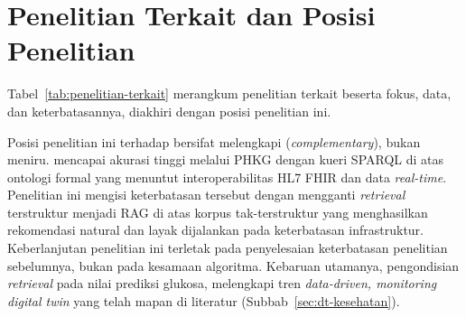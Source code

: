 \section{Penelitian Terkait dan Posisi Penelitian}
Tabel~\ref{tab:penelitian-terkait} merangkum penelitian terkait beserta fokus, data, dan keterbatasannya, diakhiri dengan posisi penelitian ini.



Posisi penelitian ini terhadap \textcite{rad2024} bersifat melengkapi (\emph{complementary}), bukan meniru. \textcite{rad2024} mencapai akurasi tinggi melalui PHKG dengan kueri SPARQL di atas ontologi formal yang menuntut interoperabilitas HL7 FHIR dan data \emph{real-time}. Penelitian ini mengisi keterbatasan tersebut dengan mengganti \emph{retrieval} terstruktur menjadi RAG di atas korpus tak-terstruktur yang menghasilkan rekomendasi natural dan layak dijalankan pada keterbatasan infrastruktur. Keberlanjutan penelitian ini terletak pada penyelesaian keterbatasan penelitian sebelumnya, bukan pada kesamaan algoritma. Kebaruan utamanya, pengondisian \emph{retrieval} pada nilai prediksi glukosa, melengkapi tren \emph{data-driven, monitoring digital twin} yang telah mapan di literatur (Subbab~\ref{sec:dt-kesehatan}).
